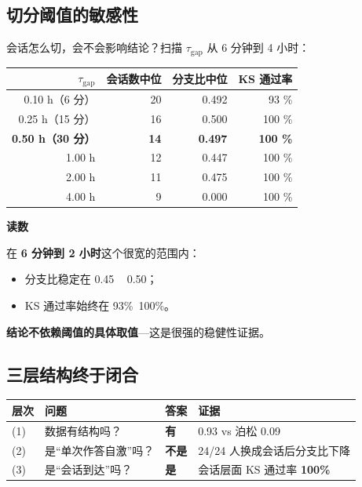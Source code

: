\documentclass[UTF8,a4paper,11pt]{ctexart}
\newenvironment{explainbox}[1]
{\begin{center}\begin{minipage}{0.94\textwidth}\colorbox{boxbg}{\parbox{0.92\textwidth}{\textbf{#1}\par\vspace{2pt}}}}
{\end{minipage}\end{center}}
\newcommand{\hl}[1]{\textcolor{blue!70!black}{\textbf{#1}}}
\newcommand{\warn}[1]{\textcolor{red!70!black}{\textbf{#1}}}
\begin{document}
\subsection{切分阈值的敏感性}

会话怎么切，会不会影响结论？扫描 $\tau_{\text{gap}}$ 从 6 分钟到 4 小时：

\begin{center}
\begin{tabular}{rrrr}
\toprule
$\tau_{\text{gap}}$ & \textbf{会话数中位} & \textbf{分支比中位} & \textbf{KS 通过率} \\
\midrule
0.10 h（6 分） & 20 & 0.492 & 93 \% \\
0.25 h（15 分） & 16 & 0.500 & 100 \% \\
\textbf{0.50 h（30 分）} & \textbf{14} & \textbf{0.497} & \textbf{100 \%} \\
1.00 h & 12 & 0.447 & 100 \% \\
2.00 h & 11 & 0.475 & 100 \% \\
4.00 h & 9 & 0.000 & 100 \% \\
\bottomrule
\end{tabular}
\end{center}

\begin{explainbox}{读数}
在 \textbf{6 分钟到 2 小时}这个很宽的范围内：
\begin{itemize}[leftmargin=1.4em,itemsep=1pt]
\item 分支比稳定在 0.45 ~ 0.50；
\item KS 通过率始终在 93\%~100\%。
\end{itemize}
\textbf{结论不依赖阈值的具体取值}---这是很强的稳健性证据。
\end{explainbox}

\subsection{三层结构终于闭合}

\begin{longtable}{@{}p{1.0cm}p{4.4cm}p{3.4cm}p{6.6cm}@{}}
\toprule
\textbf{层次} & \textbf{问题} & \textbf{答案} & \textbf{证据} \\
\midrule
{(1)}& 数据有结构吗？ & \hl{有} & 0.93 vs 泊松 0.09 \\
{(2)}& 是“单次作答自激”吗？ & \warn{不是} & 24/24 人换成会话后分支比下降 \\
{(3)}& 是“会话到达”吗？ & \hl{是} & 会话层面 KS 通过率 \textbf{100\%} \\
\bottomrule
\end{longtable}
\end{document}
